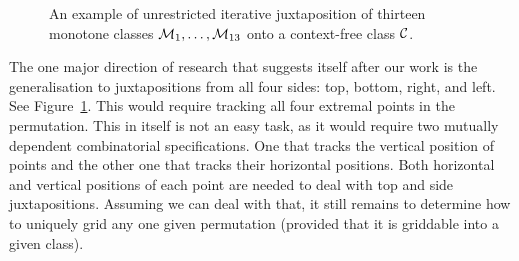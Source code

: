\documentclass[12pt, a4paper, twoside]{report}
\begin{document}
\begin{figure}[ht!]
  \begin{center}
    \caption{An example of unrestricted iterative juxtaposition of thirteen monotone classes $\mathcal{M}_1,\ldots,\mathcal{M}_{13}$ onto a context-free class $\mathcal{C}$.}
    \label{fig:juxtopia}
  \end{center}
\end{figure}


The one major direction of research that suggests itself after our work is the generalisation to juxtapositions from all four sides: top, bottom, right, and left. See Figure~\ref{fig:juxtopia}. This would require tracking all four extremal points in the permutation. This in itself is not an easy task, as it would require two mutually dependent combinatorial specifications. One that tracks the vertical position of points and the other one that tracks their horizontal positions. Both horizontal and vertical positions of each point are needed to deal with top and side juxtapositions. Assuming we can deal with that, it still remains to determine how to uniquely grid any one given permutation (provided that it is griddable into a given class).

\end{document}
